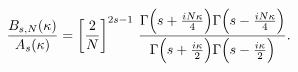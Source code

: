 \begin{equation}
\frac{B_{s,N}(\kappa)}{A_s(\kappa)}=\left[\frac{2}{N}\right]^{2s-1}\,
\frac{\Gamma\Bigl(s+\frac{iN\kappa}{4}\Bigr)\Gamma\Bigl(s-\frac{iN\kappa}{4}\Bigr)}
{\Gamma\Bigl(s+\frac{i\kappa}{2}\Bigr)\Gamma\Bigl(s-\frac{i\kappa}{2}\Bigr)}.
\end{equation}

